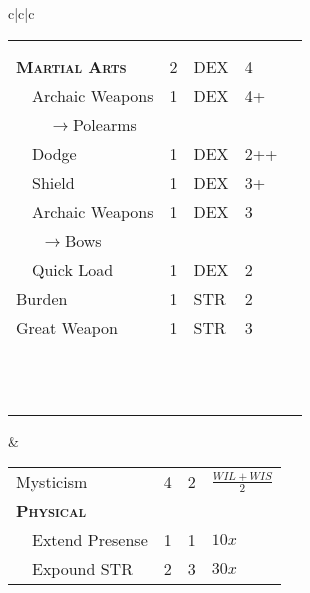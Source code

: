 \documentclass{article}
\begin{document}
\begin{tabular}{c|c|c}
\begin{tabular}{p{1.2in}|p{.15in}|p{.15in}|p{.15in}|p{.15in}}
    \hline
    & & & & \\
    \hline
    & & & & \\
    \hline
    & & & & \\
    \hline
    \hline
    \hline
    \textsc{\textbf{Martial Arts}} & 2 & \tiny{DEX} & 4 & \\
    \hline
    ~~Archaic Weapons & 1 & \tiny{DEX} & 4+ & \\
    \hline
    ~~~~$\rightarrow$Polearms & & & & \\
    \hline
    ~~Dodge & 1 & \tiny{DEX} & 2++ & \\
    \hline
    ~~Shield & 1 & \tiny{DEX} & 3+ & \\
    \hline
    ~~Archaic Weapons & 1 & \tiny{DEX} & 3 & \\
    \hline
    ~~~$\rightarrow$Bows & & & & \\
    \hline
    ~~Quick Load& 1 & \tiny{DEX} & 2 & \\
    \hline
    Burden & 1 & \tiny{STR} & 2 & \\
    \hline
    Great Weapon & 1 & \tiny{STR} & 3 & \\
    \hline
    & & & & \\
    \hline
    & & & & \\
    \hline
    & & & & \\
    \hline
    & & & & \\
    \hline
    & & & & \\
    \hline
    & & & & \\
    \hline
    & & & & \\
    \hline
    & & & & \\
    \hline
    & & & & \\
    \hline
    & & & & \\
    \hline
    & & & & \\
    \hline
    & & & & \\
  \end{tabular} &
    \begin{tabular}{p{1.4in}|p{.2in}|p{.2in}|p{.2in}}
    \textsmscbf{Name} & \texttyscbf{Rank}
    & \texttyscbf{Time} & \texttyscbf{MP} \\
    \hline
    \hline
    Mysticism & 4 & 2 & \tiny{$\frac{WIL+WIS}{2}$} \\
    \hline
    \hline
    \hline
    \textsc{\textbf{Physical}} & & & \\
    \hline
    ~~Extend Presense & 1 & 1 & $10x$ \\
    \hline
    ~~Expound STR & 2 & 3 & $30x$ \\

\end{tabular}
\end{tabular}
\end{document}
